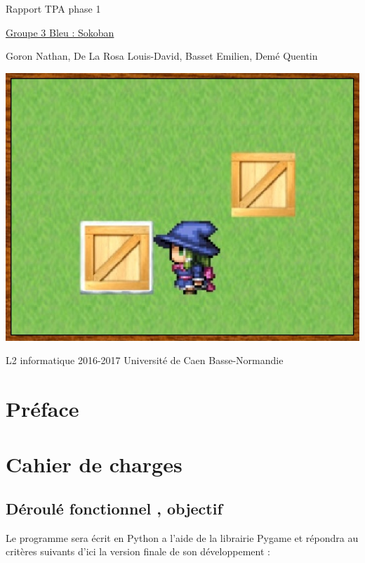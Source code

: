 \documentclass{article}
\begin{document}
\begin{titlepage}
\begin{center}
\Huge Rapport TPA phase 1

\normalsize
\vspace{0.5cm}
\Large {\underline{ Groupe 3 Bleu : Sokoban} }

\vspace{1cm}

\normalsize
Goron Nathan, De La Rosa Louis-David, Basset Emilien, Demé Quentin

\vspace{1cm}
\begin{center}
\includegraphics[scale=0.7]{../Screenshots/main.jpg}
\end{center}
\vspace{3.5cm}
L2 informatique 2016-2017 Université de Caen Basse-Normandie
\end{center}
\end{titlepage}


\newpage
\tableofcontents

\newpage
	\section{Préface}
	
	\section{Cahier de charges}
		\subsection{Déroulé fonctionnel , objectif}
		Le programme sera écrit en Python a l’aide de la librairie Pygame et répondra
au critères suivants d’ici la version finale de son développement :
\end{document}
